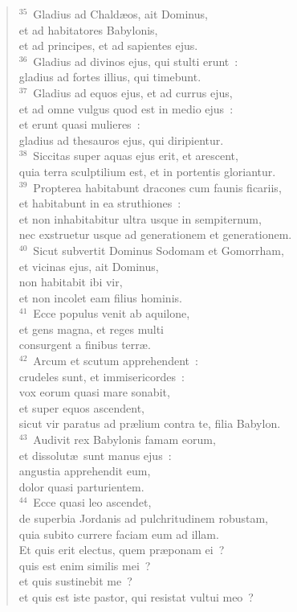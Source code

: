 \begin{flushleft}
\begin{verse}
${}^{35}$~Gladius ad Chald\ae os, ait Dominus,\\ et ad habitatores Babylonis,\\ et ad principes, et ad sapientes ejus.\\
${}^{36}$~Gladius ad divinos ejus, qui stulti erunt~:\\ gladius ad fortes illius, qui timebunt.\\
${}^{37}$~Gladius ad equos ejus, et ad currus ejus,\\ et ad omne vulgus quod est in medio ejus~:\\ et erunt quasi mulieres~:\\ gladius ad thesauros ejus, qui diripientur.\\
${}^{38}$~Siccitas super aquas ejus erit, et arescent,\\ quia terra sculptilium est, et in portentis gloriantur.\\
${}^{39}$~Propterea habitabunt dracones cum faunis ficariis,\\ et habitabunt in ea struthiones~:\\ et non inhabitabitur ultra usque in sempiternum,\\ nec exstruetur usque ad generationem et generationem.\\
${}^{40}$~Sicut subvertit Dominus Sodomam et Gomorrham,\\ et vicinas ejus, ait Dominus,\\ non habitabit ibi vir,\\ et non incolet eam filius hominis.\\
${}^{41}$~Ecce populus venit ab aquilone,\\ et gens magna, et reges multi\\ consurgent a finibus terr\ae .\\
${}^{42}$~Arcum et scutum apprehendent~:\\ crudeles sunt, et immisericordes~:\\ vox eorum quasi mare sonabit,\\ et super equos ascendent,\\ sicut vir paratus ad pr\ae lium contra te, filia Babylon.\\
${}^{43}$~Audivit rex Babylonis famam eorum,\\ et dissolut\ae\ sunt manus ejus~:\\ angustia apprehendit eum,\\ dolor quasi parturientem.\\
${}^{44}$~Ecce quasi leo ascendet,\\ de superbia Jordanis ad pulchritudinem robustam,\\ quia subito currere faciam eum ad illam.\\ Et quis erit electus, quem pr\ae ponam ei~?\\ quis est enim similis mei~?\\ et quis sustinebit me~?\\ et quis est iste pastor, qui resistat vultui meo~?\\

\end{verse}
\end{flushleft}
